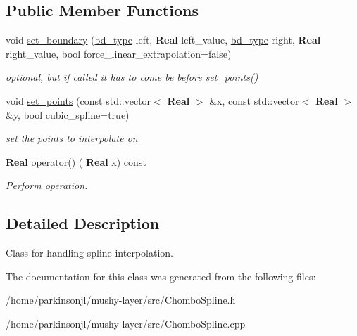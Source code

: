 \subsection*{Public Member Functions}
\begin{DoxyCompactItemize}
\item 
\mbox{\label{classspline_a8faa0e24c31c45b976606e1376e2eff2}} 
void \hyperlink{classspline_a8faa0e24c31c45b976606e1376e2eff2}{set\+\_\+boundary} (\hyperlink{classspline_a4e92a172f86289ee7171a07f1bdbf562}{bd\+\_\+type} left, \textbf{ Real} left\+\_\+value, \hyperlink{classspline_a4e92a172f86289ee7171a07f1bdbf562}{bd\+\_\+type} right, \textbf{ Real} right\+\_\+value, bool force\+\_\+linear\+\_\+extrapolation=false)
\begin{DoxyCompactList}\small\item\em optional, but if called it has to come be before \hyperlink{classspline_abfb0f9a39a5c59e72aa59e0f1ce8cc6d}{set\+\_\+points()} \end{DoxyCompactList}\item 
\mbox{\label{classspline_abfb0f9a39a5c59e72aa59e0f1ce8cc6d}} 
void \hyperlink{classspline_abfb0f9a39a5c59e72aa59e0f1ce8cc6d}{set\+\_\+points} (const std\+::vector$<$ \textbf{ Real} $>$ \&x, const std\+::vector$<$ \textbf{ Real} $>$ \&y, bool cubic\+\_\+spline=true)
\begin{DoxyCompactList}\small\item\em set the points to interpolate on \end{DoxyCompactList}\item 
\mbox{\label{classspline_a57aed09321ec0baaef9474ff6e1a9745}} 
\textbf{ Real} \hyperlink{classspline_a57aed09321ec0baaef9474ff6e1a9745}{operator()} (\textbf{ Real} x) const
\begin{DoxyCompactList}\small\item\em Perform operation. \end{DoxyCompactList}\end{DoxyCompactItemize}


\subsection{Detailed Description}
Class for handling spline interpolation. 

The documentation for this class was generated from the following files\+:\begin{DoxyCompactItemize}
\item 
/home/parkinsonjl/mushy-\/layer/src/Chombo\+Spline.\+h\item 
/home/parkinsonjl/mushy-\/layer/src/Chombo\+Spline.\+cpp\end{DoxyCompactItemize}
